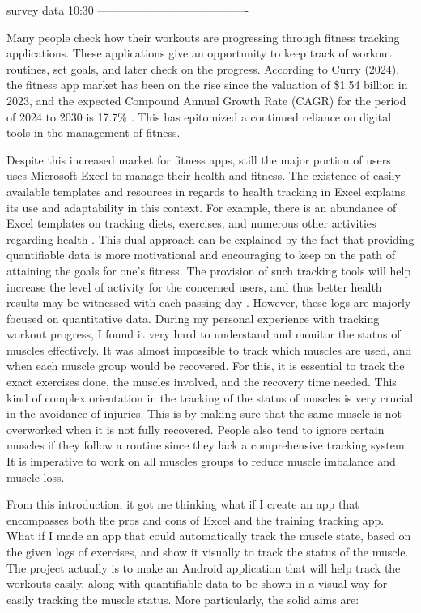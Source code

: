 survey data 10:30
----------------------------------------


Many people check how their workouts are progressing through fitness tracking applications. These applications give an opportunity to keep track of workout routines, set goals, and later check on the progress. According to Curry (2024), the fitness app market has been on the rise since the valuation of \$1.54 billion in 2023, and the expected Compound Annual Growth Rate (CAGR) for the period of 2024 to 2030 is 17.7\% \cite{curry2024}. This has epitomized a continued reliance on digital tools in the management of fitness.

Despite this increased market for fitness apps, still the major portion of users uses Microsoft Excel to manage their health and fitness. The existence of easily available templates and resources in regards to health tracking in Excel explains its use and adaptability in this context. For example, there is an abundance of Excel templates on tracking diets, exercises, and numerous other activities regarding health \cite{microsoft2024}. This dual approach can be explained by the fact that providing quantifiable data is more motivational and encouraging to keep on the path of attaining the goals for one's fitness. The provision of such tracking tools will help increase the level of activity for the concerned users, and thus better health results may be witnessed with each passing day \cite{plos2024}.
However, these logs are majorly focused on quantitative data. During my personal experience with tracking workout progress, I found it very hard to understand and monitor the status of muscles effectively. It was almost impossible to track which muscles are used, and when each muscle group would be recovered. For this, it is essential to track the exact exercises done, the muscles involved, and the recovery time needed. This kind of complex orientation in the tracking of the status of muscles is very crucial in the avoidance of injuries. This is by making sure that the same muscle is not overworked when it is not fully recovered. People also tend to ignore certain muscles if they follow a routine since they lack a comprehensive tracking system. It is imperative to work on all muscles groups to reduce muscle imbalance and muscle loss.

From this introduction, it got me thinking what if I create an app that encompasses both the pros and cons of Excel and the training tracking app. What if I made an app that could automatically track the muscle state, based on the given logs of exercises, and show it visually to track the status of the muscle. The project actually is to make an Android application that will help track the workouts easily, along with quantifiable data to be shown in a visual way for easily tracking the muscle status.
More particularly, the solid aims are:

